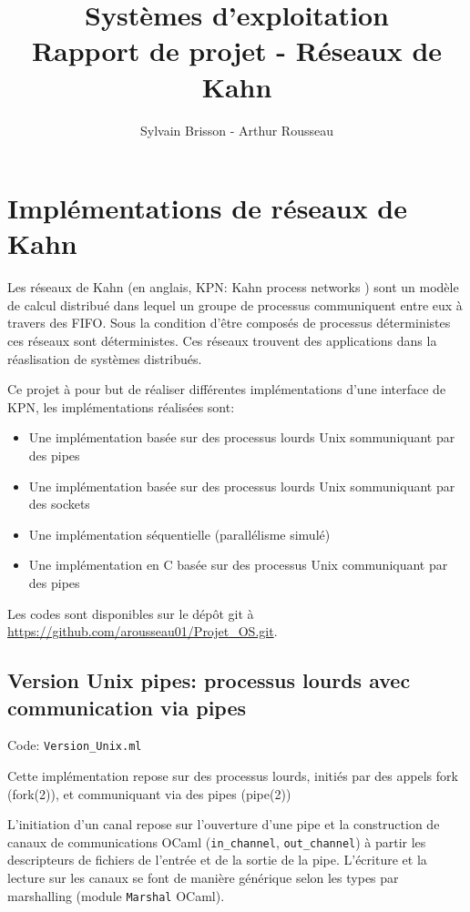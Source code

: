 \documentclass[a4paper]{article}
\title{Systèmes d'exploitation\\Rapport de projet - Réseaux de Kahn}
\author{Sylvain Brisson - Arthur Rousseau}
\date{}
\begin{document}
\maketitle
\noindent

\section{Implémentations de réseaux de Kahn}

Les réseaux de Kahn (en anglais, KPN: Kahn process networks ) sont un modèle de calcul distribué dans lequel un groupe de processus communiquent entre eux à travers des FIFO. Sous la condition d'être composés de processus déterministes ces réseaux sont déterministes. Ces réseaux trouvent des applications dans la réaslisation de systèmes distribués.

Ce projet à pour but de réaliser différentes implémentations d'une interface de KPN, les implémentations réalisées sont:
\begin{itemize}
    \item Une implémentation basée sur des processus lourds Unix sommuniquant par des pipes
    \item Une implémentation basée sur des processus lourds Unix sommuniquant par des sockets
    \item Une implémentation séquentielle (parallélisme simulé)
    \item Une implémentation en C basée sur des processus Unix communiquant par des pipes
\end{itemize}

Les codes sont disponibles sur le dépôt git à \url{https://github.com/arousseau01/Projet_OS.git}.

\subsection{Version Unix pipes: processus lourds avec communication via pipes}

Code: \verb|Version_Unix.ml|

Cette implémentation repose sur des processus lourds, initiés par des appels fork (fork(2)), et communiquant via des pipes (pipe(2))

L'initiation d'un canal repose sur l'ouverture d'une pipe et la construction de canaux de communications OCaml (\texttt{in_channel}, \texttt{out_channel}) à partir les descripteurs de fichiers de l'entrée et de la sortie de la pipe. L'écriture et la lecture sur les canaux se font de manière générique selon les types par marshalling (module \verb|Marshal| OCaml).
\end{document}
